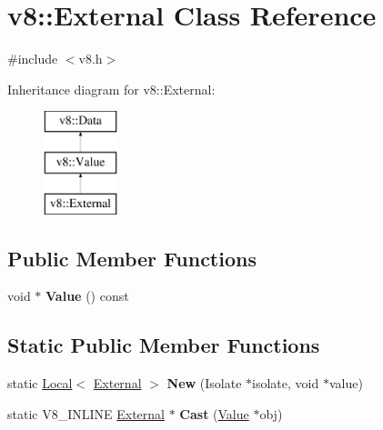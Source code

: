 \hypertarget{classv8_1_1External}{}\section{v8\+:\+:External Class Reference}
\label{classv8_1_1External}


{\ttfamily \#include $<$v8.\+h$>$}

Inheritance diagram for v8\+:\+:External\+:\begin{figure}[H]
\begin{center}
\leavevmode
\includegraphics[height=3.000000cm]{classv8_1_1External}
\end{center}
\end{figure}
\subsection*{Public Member Functions}
\begin{DoxyCompactItemize}
\item 
\mbox{\label{classv8_1_1External_a3031e0f4cc5334e725a9e2efbbbca29b}} 
void $\ast$ {\bfseries Value} () const
\end{DoxyCompactItemize}
\subsection*{Static Public Member Functions}
\begin{DoxyCompactItemize}
\item 
\mbox{\label{classv8_1_1External_a881b71b771ce579154757c0b89ba53a1}} 
static \mbox{\hyperlink{classv8_1_1Local}{Local}}$<$ \mbox{\hyperlink{classv8_1_1External}{External}} $>$ {\bfseries New} (Isolate $\ast$isolate, void $\ast$value)
\item 
\mbox{\label{classv8_1_1External_a4711aba26710c5dd72f11cb81808f9c2}} 
static V8\+\_\+\+I\+N\+L\+I\+NE \mbox{\hyperlink{classv8_1_1External}{External}} $\ast$ {\bfseries Cast} (\mbox{\hyperlink{classv8_1_1Value}{Value}} $\ast$obj)
\end{DoxyCompactItemize}


